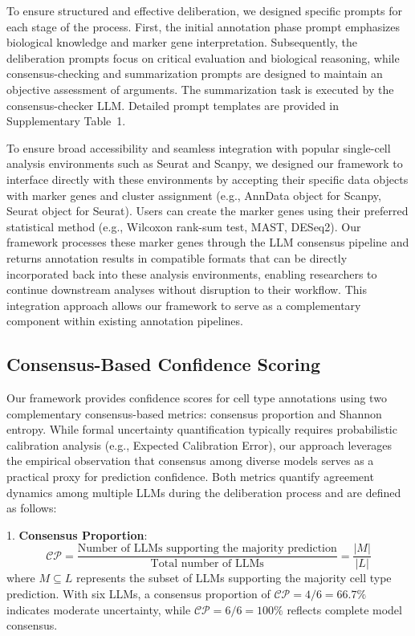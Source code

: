 \documentclass[pdflatex,sn-nature]{sn-jnl}%
\theoremstyle{thmstyleone}%
\theoremstyle{thmstyletwo}%
\theoremstyle{thmstylethree}%
\begin{document}
To ensure structured and effective deliberation, we designed specific prompts for each stage of the process. First, the initial annotation phase prompt emphasizes biological knowledge and marker gene interpretation. Subsequently, the deliberation prompts focus on critical evaluation and biological reasoning, while consensus-checking and summarization prompts are designed to maintain an objective assessment of arguments. The summarization task is executed by the consensus-checker LLM. Detailed prompt templates are provided in Supplementary Table~1.

To ensure broad accessibility and seamless integration with popular single-cell analysis environments such as Seurat and Scanpy, we designed our framework to interface directly with these environments by accepting their specific data objects with marker genes and cluster assignment (e.g., AnnData object for Scanpy,  Seurat object for Seurat). Users can create the marker genes using their preferred statistical method (e.g., Wilcoxon rank-sum test, MAST, DESeq2). Our framework processes these marker genes through the LLM consensus pipeline and returns annotation results in compatible formats that can be directly incorporated back into these analysis environments, enabling researchers to continue downstream analyses without disruption to their workflow. This integration approach allows our framework to serve as a complementary component within existing annotation pipelines.

\subsection{Consensus-Based Confidence Scoring}
Our framework provides confidence scores for cell type annotations using two complementary consensus-based metrics: consensus proportion and Shannon entropy. While formal uncertainty quantification typically requires probabilistic calibration analysis (e.g., Expected Calibration Error), our approach leverages the empirical observation that consensus among diverse models serves as a practical proxy for prediction confidence\cite{Page2007TheDifference}. Both metrics quantify agreement dynamics among multiple LLMs during the deliberation process and are defined as follows:

1. \textbf{Consensus Proportion}:
\begin{equation}
\mathcal{CP} = \frac{\text{Number of LLMs supporting the majority prediction}}{\text{Total number of LLMs}} = \frac{|M|}{|L|}
\end{equation}
where $M \subseteq L$ represents the subset of LLMs supporting the majority cell type prediction. With six LLMs, a consensus proportion of $\mathcal{CP} = 4/6 = 66.7\%$ indicates moderate uncertainty, while $\mathcal{CP} = 6/6 = 100\%$ reflects complete model consensus.
\end{document}
